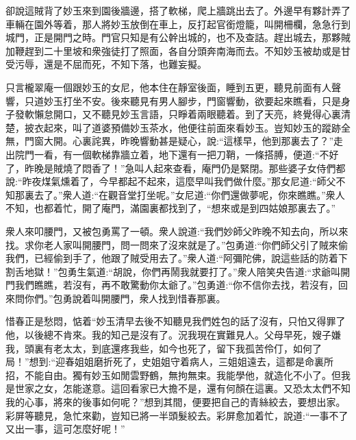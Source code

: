 \begin{parag}
    卻說這賊背了妙玉來到園後牆邊，搭了軟梯，爬上牆跳出去了。外邊早有夥計弄了車輛在園外等着，那人將妙玉放倒在車上，反打起官銜燈籠，叫開柵欄，急急行到城門，正是開門之時。門官只知是有公幹出城的，也不及查詰。趕出城去，那夥賊加鞭趕到二十里坡和衆強徒打了照面，各自分頭奔南海而去。不知妙玉被劫或是甘受污辱，還是不屈而死，不知下落，也難妄擬。
\end{parag}


\begin{parag}
    只言櫳翠庵一個跟妙玉的女尼，他本住在靜室後面，睡到五更，聽見前面有人聲響，只道妙玉打坐不安。後來聽見有男人腳步，門窗響動，欲要起來瞧看，只是身子發軟懶怠開口，又不聽見妙玉言語，只睜着兩眼聽着。到了天亮，終覺得心裏清楚，披衣起來，叫了道婆預備妙玉茶水，他便往前面來看妙玉。豈知妙玉的蹤跡全無，門窗大開。心裏詫異，昨晚響動甚是疑心，說:“這樣早，他到那裏去了？”走出院門一看，有一個軟梯靠牆立着，地下還有一把刀鞘，一條搭膊，便道:“不好了，昨晚是賊燒了悶香了！”急叫人起來查看，庵門仍是緊閉。那些婆子女侍們都說:“昨夜煤氣燻着了，今早都起不起來，這麼早叫我們做什麼。”那女尼道:“師父不知那裏去了。”衆人道:“在觀音堂打坐呢。”女尼道:“你們還做夢呢，你來瞧瞧。”衆人不知，也都着忙，開了庵門，滿園裏都找到了，“想來或是到四姑娘那裏去了。”
\end{parag}


\begin{parag}
    衆人來叩腰門，又被包勇罵了一頓。衆人說道:“我們妙師父昨晚不知去向，所以來找。求你老人家叫開腰門，問一問來了沒來就是了。”包勇道:“你們師父引了賊來偷我們，已經偷到手了，他跟了賊受用去了。”衆人道:“阿彌陀佛，說這些話的防着下割舌地獄！”包勇生氣道:“胡說，你們再鬧我就要打了。”衆人陪笑央告道:“求爺叫開門我們瞧瞧，若沒有，再不敢驚動你太爺了。”包勇道:“你不信你去找，若沒有，回來問你們。”包勇說着叫開腰門，衆人找到惜春那裏。
\end{parag}


\begin{parag}
    惜春正是愁悶，惦着“妙玉清早去後不知聽見我們姓包的話了沒有，只怕又得罪了他，以後總不肯來。我的知己是沒有了。況我現在實難見人。父母早死，嫂子嫌我，頭裏有老太太，到底還疼我些，如今也死了，留下我孤苦伶仃，如何了局！”想到:“迎春姐姐磨折死了，史姐姐守着病人，三姐姐遠去，這都是命裏所招，不能自由。獨有妙玉如閒雲野鶴，無拘無束。我能學他，就造化不小了。但我是世家之女，怎能遂意。這回看家已大擔不是，還有何顏在這裏。又恐太太們不知我的心事，將來的後事如何呢？”想到其間，便要把自己的青絲絞去，要想出家。彩屏等聽見，急忙來勸，豈知已將一半頭髮絞去。彩屏愈加着忙，說道:“一事不了又出一事，這可怎麼好呢！”
\end{parag}


